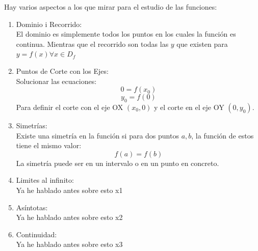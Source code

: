 \documentclass[arial,a4paper,print]{article}
\begin{document}
Hay varios aspectos a los que mirar para el estudio de las funciones:
\begin{enumerate}

\item Dominio i Recorrido:\\
El dominio es simplemente todos los puntos en los cuales la función es continua. Mientras que el recorrido son todas las $y$ que existen para $y = f(x) \forall x\in D_{f}$

\item Puntos de Corte con los Ejes:\\
Solucionar las ecuaciones:
\begin{equation*}
	0 = f(x_{0})
\end{equation*}
\begin{equation*}
	y_{0} = f(0)
\end{equation*}
Para definir el corte con el eje OX $(x_{0}, 0)$ y el corte en el eje OY $(0, y_{0})$. 

\item Simetrías: \\
Existe una simetría en la función si para dos puntos $a, b$, la función de estos tiene el mismo valor:
\begin{equation*}
	f(a) = f(b)
\end{equation*}
La simetría puede ser en un intervalo o en un punto en concreto. 

\item Limites al infinito: \\
Ya he hablado antes sobre esto x1

\item Asíntotas:\\
Ya he hablado antes sobre esto x2

\item Continuidad:\\
Ya he hablado antes sobre esto x3

\end{enumerate}
\end{document}
